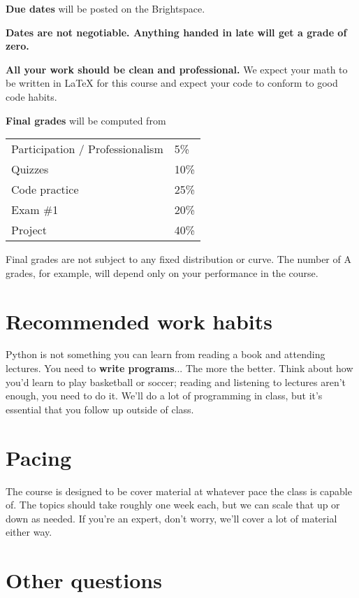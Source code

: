 \documentclass[12pt,pdftex,twoside,letterpaper]{exam}
\begin{document}
    {\bf Due dates} will be posted on the Brightspace.

    {\bf Dates are not negotiable. Anything handed in late will get a grade of zero.}

    {\bf All your work should be clean and professional.} We expect your math to be written in
    LaTeX for this course and expect your code to conform to good code habits.

    {\bf Final grades\/} will be computed from

    \begin{center}
      \begin{tabular}{ll}
        Participation / Professionalism & 5\% \\
        Quizzes & 10\% \\
        Code practice & 25\% \\
        Exam \#1        & 20\% \\
        Project        & 40\% \\
      \end{tabular}
    \end{center}

    Final grades are not subject to any fixed distribution or curve. The number of A grades, for
    example, will depend only on your performance in the course.

\section*{Recommended work habits}

  Python is not something you can learn from reading a book and attending lectures. You need to
  {\bf write programs}... The more the better. Think about how you'd learn to play basketball
  or soccer; reading and listening to lectures aren't enough, you need to do it. We'll do a lot of
  programming in class, but it's {essential} that you follow up outside of class.

\section*{Pacing}

  The course is designed to be cover material at whatever pace the class is capable of. The topics
  should take roughly one week each, but we can scale that up or down as needed. If you're an expert,
  don't worry, we'll cover a lot of material either way.

\section*{Other questions}
\end{document}
